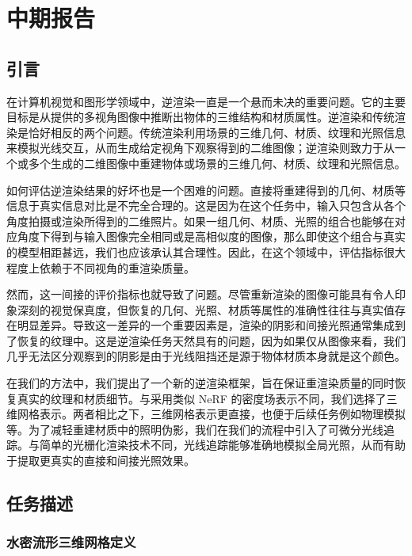 
\chapter{中期报告}

\section{引言}

在计算机视觉和图形学领域中，逆渲染一直是一个悬而未决的重要问题。它的主要目标是从提供的多视角图像中推断出物体的三维结构和材质属性。逆渲染和传统渲染是恰好相反的两个问题。传统渲染利用场景的三维几何、材质、纹理和光照信息来模拟光线交互，从而生成给定视角下观察得到的二维图像；逆渲染则致力于从一个或多个生成的二维图像中重建物体或场景的三维几何、材质、纹理和光照信息。

如何评估逆渲染结果的好坏也是一个困难的问题。直接将重建得到的几何、材质等信息于真实信息对比是不完全合理的。这是因为在这个任务中，输入只包含从各个角度拍摄或渲染所得到的二维照片。如果一组几何、材质、光照的组合也能够在对应角度下得到与输入图像完全相同或是高相似度的图像，那么即使这个组合与真实的模型相距甚远，我们也应该承认其合理性。因此，在这个领域中，评估指标很大程度上依赖于不同视角的重渲染质量。

然而，这一间接的评价指标也就导致了问题。尽管重新渲染的图像可能具有令人印象深刻的视觉保真度，但恢复的几何、光照、材质等属性的准确性往往与真实值存在明显差异。导致这一差异的一个重要因素是，渲染的阴影和间接光照通常集成到了恢复的纹理中。这是逆渲染任务天然具有的问题，因为如果仅从图像来看，我们几乎无法区分观察到的阴影是由于光线阻挡还是源于物体材质本身就是这个颜色。

在我们的方法中，我们提出了一个新的逆渲染框架，旨在保证重渲染质量的同时恢复真实的纹理和材质细节。与采用类似 NeRF\cite{nerf} 的密度场表示不同，我们选择了三维网格表示。两者相比之下，三维网格表示更直接，也便于后续任务例如物理模拟等。为了减轻重建材质中的照明伪影，我们在我们的流程中引入了可微分光线追踪。与简单的光栅化渲染技术不同，光线追踪能够准确地模拟全局光照，从而有助于提取更真实的直接和间接光照效果。

\section{任务描述}

\subsection*{水密流形三维网格定义}

